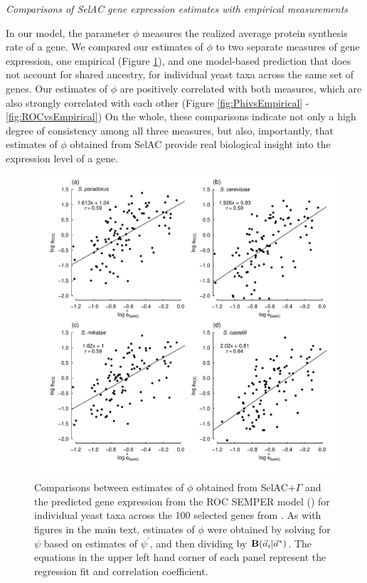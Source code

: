 \documentclass[12pt,letterpaper,fleqn]{article}
\renewcommand{\subsection}[1]{%
\bigskip
\begin{center}
\begin{large}
\normalfont\itshape #1
\end{large}
\end{center}}
\newcommand{\Funcaveci}{\ensuremath{\Func(\aveci|\aoptvec)}\xspace}
\newcommand{\Func}{\ensuremath{\text{\textbf{B}}}\xspace}
\newcommand{\selacplusgamma}{SelAC$+\Gamma$\xspace}
\newcommand{\aoptvec}{\ensuremath{\Vec{a}^*}\xspace}
\newcommand{\aveci}{\ensuremath{\Vec{a}_i}\xspace}
\newcommand{\psiprime}{\ensuremath{\psi^\prime}\xspace}
\begin{document}
\subsection{Comparisons of SelAC gene expression estimates with empirical measurements}

In our model, the parameter $\phi$ measures the realized average protein synthesis rate of a gene.
We compared our estimates of $\phi$ to two separate measures of gene expression, one empirical (Figure \ref{fig:PhivsROC}), and one model-based prediction that does not account for shared ancestry, for individual yeast taxa across the same set of genes.
Our estimates of $\phi$ are positively correlated with both measures, which are also strongly correlated with each other (Figure \ref{fig:PhivsEmpirical} - \ref{fig:ROCvsEmpirical})
On the whole, these comparisons indicate not only a high degree of consistency among all three measures, but also, importantly, that estimates of $\phi$ obtained from SelAC provide real biological insight into the expression level of a gene.

\begin{figure}[H]
  \centering
  \includegraphics[width=0.9\linewidth]{FIGURE_S1_SelACwG_vs_ROC_by_spp.pdf}
  \caption{Comparisons between estimates of $\phi$ obtained from \selacplusgamma and the predicted gene expression from the ROC SEMPER model (\citet{GilchristEtAl2015}) for individual yeast taxa across the 100 selected genes from \citet{SalichosAndRokas2013}.
        As with figures in the main text, estimates of $\phi$ were obtained by solving for $\psi$ based on estimates of $\psiprime$, and then dividing by \Funcaveci.
                The equations in the upper left hand corner of each panel represent the regression fit and correlation coefficient.
  }
  \label{fig:PhivsROC}
\end{figure}
\end{document}
